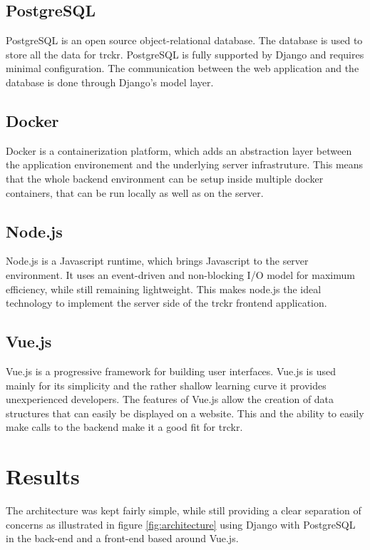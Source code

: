 \documentclass[bibliography=totoc, listof=totocnumbered]{scrartcl}
\begin{document}
\subsection{PostgreSQL}
PostgreSQL is an open source object-relational database.\cite{postgre} The database is used to store all the data for trckr. PostgreSQL is fully
supported by Django and requires minimal configuration. The communication between the web application and the database is done through Django's model layer.

\subsection{Docker}
Docker is a containerization platform, which adds an abstraction layer between the application environement and the underlying server infrastruture.\cite{docker} This means that the whole backend environment can be setup inside multiple docker containers, that can be run locally as well as on the server. 

\subsection{Node.js}
Node.js is a Javascript runtime, which brings Javascript to the server environment.\cite{nodejs} It uses an event-driven and non-blocking I/O model for maximum efficiency, while still remaining lightweight. This makes node.js the ideal technology to implement the server side of the trckr frontend application.

\subsection{Vue.js}
Vue.js is a progressive framework for building user interfaces.\cite{vuejs}
Vue.js is used mainly for its simplicity and the rather shallow learning curve
it provides unexperienced developers. The features of Vue.js allow
the creation of data structures that can easily be displayed on a website. This
and the ability to easily make calls to the backend make it a good fit for
trckr.

\section{Results}
The architecture was kept fairly simple, while still providing a clear
separation of concerns as illustrated in figure \ref{fig:architecture} using
Django with PostgreSQL in the back-end and a front-end based around Vue.js.
\end{document}
